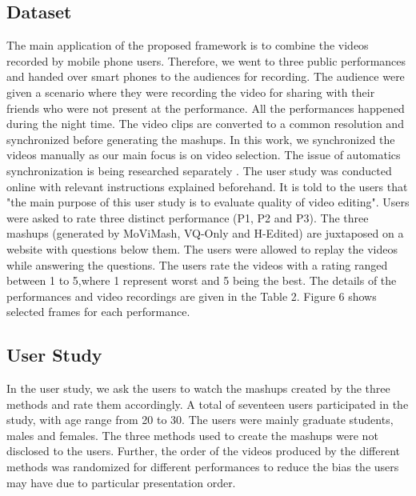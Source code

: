 \documentclass{sig-alternate}
\begin{document}
\subsection{Dataset}
The main application of the proposed framework is to combine the videos recorded by mobile phone users. Therefore, we went to three public performances and handed over smart phones to the audiences for recording. The audience were given a scenario where they were recording the video for sharing with their friends who were not present at the performance. All the performances happened during the night time. The video clips are converted to a common resolution and synchronized before generating the mashups. In this work, we synchronized the videos manually as our main focus is on video selection. The issue of automatics synchronization is being researched separately \cite{frakes1992information}. The user study was conducted online with relevant instructions explained beforehand. It is told to the users that "the main purpose of this user study is to evaluate quality of video editing". Users were asked to rate three distinct performance (P1, P2 and P3). The three mashups (generated by MoViMash, VQ-Only and H-Edited) are juxtaposed on a website with questions below them. The users were allowed to replay the videos while answering the questions. The users rate the videos with a rating ranged between 1 to 5,where 1 represent worst and 5 being the best. The details of the performances and video recordings are given in the Table 2. Figure 6 shows selected frames for each performance.


\subsection{User Study}
 In the user study, we ask the users to watch the mashups created by the three methods and rate them accordingly. A total of seventeen users participated in the study, with age range from 20 to 30. The users were mainly graduate students, males and females. The three methods used to create the mashups were not disclosed to the users. Further, the order of the videos produced by the different methods was randomized for different performances to reduce the bias the users may have due to particular presentation order.
 
\end{document}
